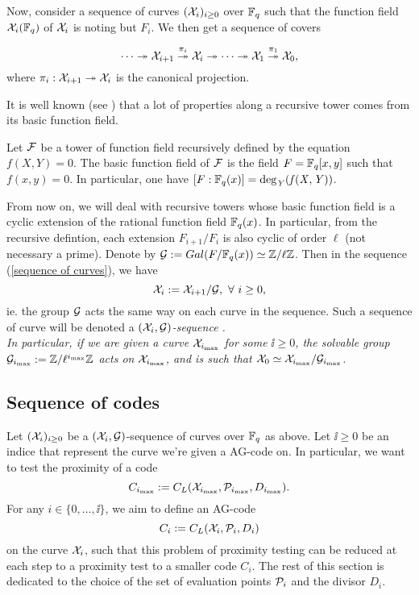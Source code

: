 \documentclass[10pt]{article}
\begin{document}
Now, consider a sequence of curves $(\mathcal{X}_i)_{i \geq 0}$ over $\mathbb{F}_q$ such that the function field $\mathcal{X}_i(\mathbb{F}_q)$ of $\mathcal{X}_i$ is noting but $F_i$. We then get a sequence of covers 

\begin{equation} \label{sequence of curves}
\cdots \twoheadrightarrow \mathcal{X}_{i+1} \overset{\pi_i}{\twoheadrightarrow} \mathcal{X}_i \twoheadrightarrow \cdots \twoheadrightarrow \mathcal{X}_1 \overset{\pi_1}{\twoheadrightarrow} \mathcal{X}_0,
\end{equation}
where $\pi_i : \mathcal{X}_{i+1} \twoheadrightarrow \mathcal{X}_i$ is the canonical projection.

It is well known (see \cite{GS}) that a lot of properties along a recursive tower comes from its basic function field.

\s

\begin{def1} \label{basic function field}
Let $\mathcal{F}$ be a tower of function field recursively defined by the equation $f(X,Y)=0$. The basic function field of $\mathcal{F}$ is the field $F=\mathbb{F}_q[x,y]$ such that $f(x,y)=0$. In particular, one have $[F:\mathbb{F}_q(x)]=\rm{deg}_{\it Y}\it (f(X,Y))$.
\end{def1} 

\s

From now on, we will deal with recursive towers whose basic function field is a cyclic extension of the rational function field $\mathbb{F}_q(x)$. In particular, from the recursive defintion, each extension $F_{i+1}/F_i$ is also cyclic of order $\ell$ (not necessary a prime). Denote by $\mathcal{G} := Gal(F/\mathbb{F}_q(x)) \simeq \mathbb{Z}/\ell \mathbb{Z}$. Then in the sequence (\ref{sequence of curves}), we have 
\[ \calX_{i} := \calX_{i+1}/\calG, \ \forall \ i \geq 0,\]
ie. the group $\mathcal{G}$ acts the same way on each curve in the sequence. Such a sequence of curve will be denoted a \it $(\mathcal{X}_i,\mathcal{G})$-sequence \rm.  \\
In particular, if we are given a curve $\mathcal{X}_{i_{\rm{max}}}$ for some $\ii \geq 0$, the solvable group $\mathcal{G}_{i_{\rm{max}}} := \mathbb{Z}/\ell^{i_{\rm{max}}}\mathbb{Z}$ acts on $\mathcal{X}_{i_{\rm{max}}}$, and is such that $\mathcal{X}_0 \simeq \mathcal{X}_{i_{\rm{max}}}/\mathcal{G}_{i_{\rm{max}}}$.

\s

\subsection{Sequence of codes}

\s

Let $(\mathcal{X}_i)_{i \geq 0}$ be a $(\mathcal{X}_i,\mathcal{G})$-sequence of curves over $\mathbb{F}_q$ as above. Let $\ii \geq 0$ be an indice that represent the curve we're given a AG-code on. In particular, we want to test the proximity of a code 
\[C_{i_{\rm{max}}} := C_L(\mathcal{X}_{i_{\rm{max}}},\mathcal{P}_{i_{\rm{max}}},D_{i_{\rm{max}}}).\]
For any $i \in \{0,...,\ii\}$, we aim to define an AG-code 
\[C_i := C_L(\mathcal{X}_i,\mathcal{P}_i,D_i)\]
on the curve $\mathcal{X}_i$, such that this problem of proximity testing can be reduced at each step to a proximity test to a smaller code $C_i$. The rest of this section is dedicated to the choice of the set of evaluation points $\mathcal{P}_i$ and the divisor $D_i$.
\end{document}
